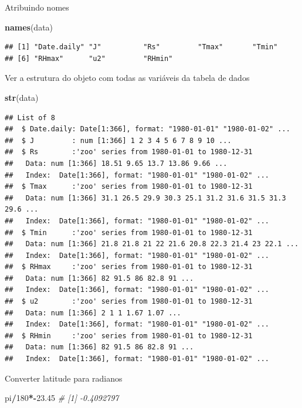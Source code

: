 \documentclass[
]{book}
\newenvironment{Shaded}{\begin{snugshade}}{\end{snugshade}}
\newcommand{\CommentTok}[1]{\textcolor[rgb]{0.56,0.35,0.01}{\textit{#1}}}
\newcommand{\DecValTok}[1]{\textcolor[rgb]{0.00,0.00,0.81}{#1}}
\newcommand{\FloatTok}[1]{\textcolor[rgb]{0.00,0.00,0.81}{#1}}
\newcommand{\KeywordTok}[1]{\textcolor[rgb]{0.13,0.29,0.53}{\textbf{#1}}}
\newcommand{\NormalTok}[1]{#1}
\newcommand{\OperatorTok}[1]{\textcolor[rgb]{0.81,0.36,0.00}{\textbf{#1}}}
\begin{document}
Atribuindo nomes

\begin{Shaded}
\begin{Highlighting}[]
\KeywordTok{names}\NormalTok{(data)}
\end{Highlighting}
\end{Shaded}

\begin{verbatim}
## [1] "Date.daily" "J"          "Rs"         "Tmax"       "Tmin"      
## [6] "RHmax"      "u2"         "RHmin"
\end{verbatim}

Ver a estrutura do objeto com todas as variáveis da tabela de dados

\begin{Shaded}
\begin{Highlighting}[]
\KeywordTok{str}\NormalTok{(data)}
\end{Highlighting}
\end{Shaded}

\begin{verbatim}
## List of 8
##  $ Date.daily: Date[1:366], format: "1980-01-01" "1980-01-02" ...
##  $ J         : num [1:366] 1 2 3 4 5 6 7 8 9 10 ...
##  $ Rs        :'zoo' series from 1980-01-01 to 1980-12-31
##   Data: num [1:366] 18.51 9.65 13.7 13.86 9.66 ...
##   Index:  Date[1:366], format: "1980-01-01" "1980-01-02" ...
##  $ Tmax      :'zoo' series from 1980-01-01 to 1980-12-31
##   Data: num [1:366] 31.1 26.5 29.9 30.3 25.1 31.2 31.6 31.5 31.3 29.6 ...
##   Index:  Date[1:366], format: "1980-01-01" "1980-01-02" ...
##  $ Tmin      :'zoo' series from 1980-01-01 to 1980-12-31
##   Data: num [1:366] 21.8 21.8 21 22 21.6 20.8 22.3 21.4 23 22.1 ...
##   Index:  Date[1:366], format: "1980-01-01" "1980-01-02" ...
##  $ RHmax     :'zoo' series from 1980-01-01 to 1980-12-31
##   Data: num [1:366] 82 91.5 86 82.8 91 ...
##   Index:  Date[1:366], format: "1980-01-01" "1980-01-02" ...
##  $ u2        :'zoo' series from 1980-01-01 to 1980-12-31
##   Data: num [1:366] 2 1 1 1.67 1.07 ...
##   Index:  Date[1:366], format: "1980-01-01" "1980-01-02" ...
##  $ RHmin     :'zoo' series from 1980-01-01 to 1980-12-31
##   Data: num [1:366] 82 91.5 86 82.8 91 ...
##   Index:  Date[1:366], format: "1980-01-01" "1980-01-02" ...
\end{verbatim}

Converter latitude para radianos

\begin{Shaded}
\begin{Highlighting}[]
\NormalTok{pi}\OperatorTok{/}\DecValTok{180}\OperatorTok{*-}\FloatTok{23.45} \CommentTok{# [1] -0.4092797}
\end{Highlighting}
\end{Shaded}
\end{document}
